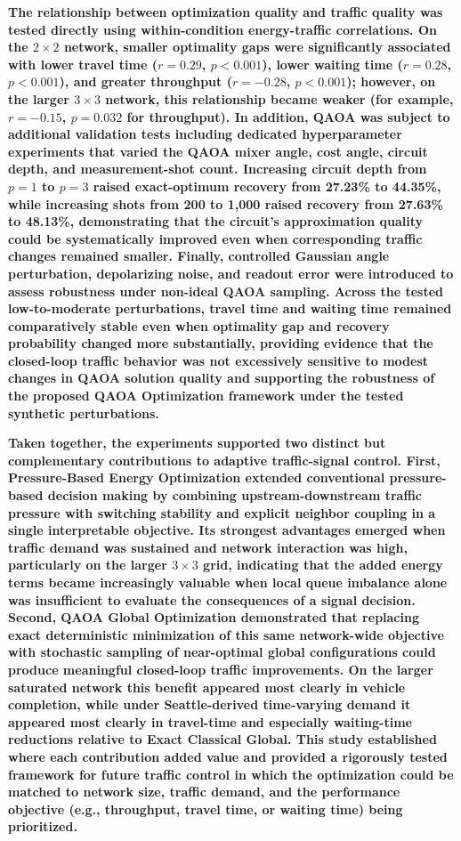 \textbf{
The relationship between optimization quality and traffic
quality was tested directly using within-condition energy-traffic
correlations. On the $2\times2$ network, smaller optimality gaps were
significantly associated with lower travel time ($r=0.29$, $p<0.001$), lower
waiting time ($r=0.28$, $p<0.001$), and greater throughput
($r=-0.28$, $p<0.001$); however, on the larger $3\times3$ network, this relationship
became weaker (for example, $r=-0.15$, $p=0.032$ for throughput). In addition, QAOA was subject
to additional validation tests including dedicated
hyperparameter experiments that varied the QAOA mixer angle, cost angle,
circuit depth, and measurement-shot count. Increasing circuit depth from
$p=1$ to $p=3$ raised exact-optimum recovery from 27.23\% to 44.35\%, while
increasing shots from 200 to 1,000 raised recovery from 27.63\% to 48.13\%,
demonstrating that the circuit's approximation quality could be systematically
improved even when corresponding traffic changes remained smaller. Finally,
controlled Gaussian angle perturbation, depolarizing noise, and readout error
were introduced to assess robustness under non-ideal QAOA sampling. Across the
tested low-to-moderate perturbations, travel time and waiting time remained
comparatively stable even when optimality gap and recovery probability changed
more substantially, providing evidence that the closed-loop traffic behavior was
not excessively sensitive to modest changes in QAOA solution quality and
supporting the robustness of the proposed QAOA Optimization framework under
the tested synthetic perturbations.
}

\textbf{
Taken together, the experiments supported two distinct but complementary
contributions to adaptive traffic-signal control. First,
Pressure-Based Energy Optimization extended conventional
pressure-based decision making by combining upstream-downstream traffic
pressure with switching stability and explicit neighbor
coupling in a single interpretable objective. Its strongest advantages emerged when traffic demand was sustained and network interaction
was high, particularly on the larger $3\times3$ grid, indicating that the added
energy terms became increasingly valuable when local queue imbalance alone was
insufficient to evaluate the consequences of a signal decision. Second,
QAOA Global Optimization demonstrated that replacing exact
deterministic minimization of this same network-wide objective with stochastic
sampling of near-optimal global configurations could produce meaningful
closed-loop traffic improvements. On the larger saturated network this benefit
appeared most clearly in vehicle completion, while under Seattle-derived
time-varying demand it appeared most clearly in travel-time and especially waiting-time
reductions relative to Exact Classical Global. This study established where each contribution added value and provided a rigorously tested framework for future traffic control in which the optimization could be matched to network size, traffic demand, and the performance objective (e.g., throughput, travel time, or waiting time) being prioritized.
}

